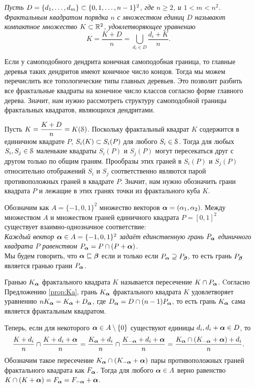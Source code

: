 {\em Пусть $D=\{d_1,\ldots,d_m\}\subset\{0,1,\ldots,n-1\}^2$, где $n\ge 2$, и $1<m<n^2$. 
{\em Фрактальным квадратом} порядка $n$ с {\em множеством единиц $D$} называют компактное множество $K\subset\mathbb{R}^2$, удовлетворяющее уравнению
$$K=\dfrac{K+D}{n}=\bigcup_{d_i\in D}\dfrac{d_i+K}{n}.$$}

Если у самоподобного дендрита конечная самоподобная граница, то главные деревья таких дендритов имеют конечное число концов.
Тогда мы можем перечислить все топологические типы главных деревьев.
Это позволит разбить все фрактальные квадраты на конечное число классов согласно форме главного дерева.
Значит,  нам нужно рассмотреть структуру самоподобной границы фрактальных квадратов, являющихся дендритами.

Пусть $K=\dfrac{K+D}{n}=K({\EuScript S})$.
Поскольку фрактальный квадрат $K$ содержится в единичном квадрате $P$, \quad $S_i(K)\subset S_i(P)$ для любого $S_i\in{\EuScript S}$.
Тогда для любых $S_i, S_j\in{\EuScript S}$ маленькие квадраты $S_i(P)$ и $S_j(P)$ могут пересекаться друг с другом только по общим граням.
Прообразы этих граней в $S_i(P)$ и $S_j(P)$ относительно отображений $S_i$ и $S_j$ соответственно являются парой противоположных граней в квадрате $P$.
Значит, нам нужно обозначить грани квадрата $P$ и лежащие в этих гранях точки из фрактального куба $K$.

Обозначим как $A=\{-1,0,1\}^2$ множество векторов ${\bm{\alpha}}=(\alpha_1,\alpha_2)$.
Между множеством $A$ и множеством граней единичного квадрата $P=[0,1]^2$ существует взаимно-однозначное соответствие:\\

{\em Каждый вектор ${\bm{\alpha}}\in A=\{-1,0,1\}^2$ задаёт единственную грань $P_{\bm{\alpha}}$ единичного квадрата $P$ равенством $P_{\bm{\alpha}}=P\cap(P+{\bm{\alpha}})$.}\\

Мы будем говорить, что ${\bm{\alpha}}\sqsubseteq{\bm{\beta}}$ если и только если $P_{\bm{\alpha}}\supseteq P_{\bm{\beta}}$, то есть грань $P_{\bm{\beta}}$ является гранью грани $P_{\bm{\alpha}}$.

Гранью $K_{\bm{\alpha}}$ фрактального квадрата $K$ называется пересечение $K\cap P_{\bm{\alpha}}$.
Cогласно Предложению \ref{prop:Ka}, грань $K_{\bm{\alpha}}$ фрактального квадрата $K$ удовлетворяет уравнению $n K_{\bm{\alpha}}=K_{\bm{\alpha}}+D_{\bm{\alpha}}$, где $D_{\bm{\alpha}}=D\cap(n-1)P_{\bm{\alpha}}$, то есть грань $K_{\bm{\alpha}}$ сама является фрактальным квадратом.

Теперь, если для некоторого ${\bm{\alpha}}\in A\setminus\{0\}$ существуют единицы $d_i,d_i+{\bm{\alpha}}\in D$, то
$$\dfrac{K+d_i}{n}\cap\dfrac{K+d_i+{\bm{\alpha}}}{n}=\dfrac{K_{\bm{\alpha}}+d_i}{n}\cap\dfrac{K_{-{\bm{\alpha}}}+d_i+{\bm{\alpha}}}{n}=\dfrac{K_{\bm{\alpha}}\cap(K_{-{\bm{\alpha}}}+{\bm{\alpha}})+d_i}{n}.$$
Обозначим такое пересечение $K_{\bm{\alpha}}\cap(K_{-{\bm{\alpha}}}+{\bm{\alpha}})$ пары противоположных граней фрактального квадрата как $F_{\bm{\alpha}}$.
Тогда для любого ${\bm{\alpha}}\in A$ верно равенство $K\cap(K+{\bm{\alpha}})=F_{\bm{\alpha}}=F_{-{\bm{\alpha}}}+{\bm{\alpha}} $.

